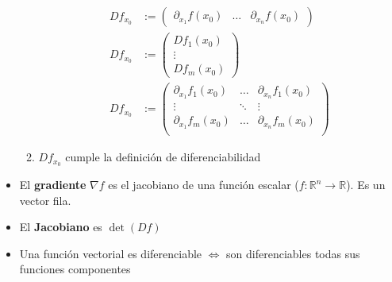\documentclass[a4paper,twocolumn]{extarticle}
\newcommand{\R}{\mathbb{R}}
\begin{document}
\begin{itemize}
\begin{enumerate}
		\begin{align*}
			Df_{x_0} &:= \left(\begin{array}{c|c|c}
				\partial_{x_1}f(x_0) & \dots & \partial_{x_n}f(x_0)
			\end{array}\right)\\
			Df_{x_0} &:= \left(\begin{array}{c}
			Df_1(x_0) \\\hline
			\vdots \\\hline
			Df_m(x_0) 
			\end{array}\right) \\
			Df_{x_0} &:= \left(\begin{array}{ccc}
			\partial_{x_1}f_1(x_0) & \dots & \partial_{x_n}f_1(x_0) \\
			\vdots & \ddots & \vdots \\
			\partial_{x_1}f_m(x_0) & \dots & \partial_{x_n}f_m(x_0) \\
			\end{array}\right)
		\end{align*}
		\item $Df_{x_0}$ cumple la definición de diferenciabilidad
	\end{enumerate}
	\item El \textbf{gradiente} $\nabla f$ es el jacobiano de una función escalar ($f: \R^n \to \R$). Es un vector fila.
	\item El \textbf{Jacobiano} es $\det(Df)$
	\item Una función vectorial es diferenciable $\iff$ son diferenciables todas sus funciones componentes
\end{itemize}
\end{document}
